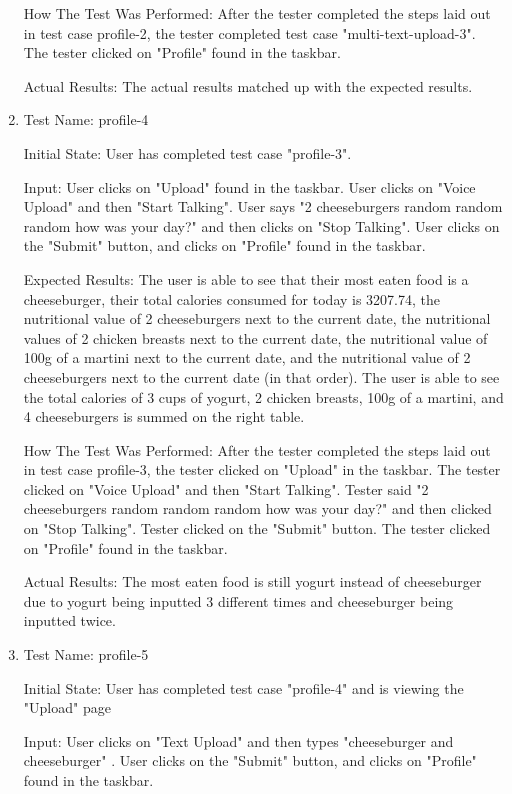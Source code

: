 \documentclass[12pt, titlepage]{article}
\begin{document}
\begin{enumerate}
		How The Test Was Performed: After the tester completed the steps laid out in test case profile-2, the tester completed test case "multi-text-upload-3". The tester clicked on "Profile" found in the taskbar.
		
		Actual Results: The actual results matched up with the expected results.
		
		\item{Test Name: profile-4}
		
		Initial State: User has completed test case "profile-3".
		
		Input: User clicks on "Upload" found in the taskbar. User clicks on "Voice Upload" and then "Start Talking". User says "2 cheeseburgers random random random how was your day?" and then clicks on "Stop Talking". User clicks on the "Submit" button, and clicks on "Profile" found in the taskbar.
		
		Expected Results: The user is able to see that their most eaten food is a cheeseburger, their total calories consumed for today is 3207.74, the nutritional value of 2 cheeseburgers next to the current date, the nutritional values of 2 chicken breasts next to the current date, the nutritional value of 100g of a martini next to the current date, and the nutritional value of 2 cheeseburgers next to the current date (in that order). The user is able to see the total calories of 3 cups of yogurt, 2 chicken breasts, 100g of a martini, and 4 cheeseburgers is summed on the right table.
		
		How The Test Was Performed: After the tester completed the steps laid out in test case profile-3, the tester clicked on "Upload" in the taskbar. The tester clicked on "Voice Upload" and then "Start Talking". Tester said "2 cheeseburgers random random random how was your day?" and then clicked on "Stop Talking". Tester clicked on the "Submit" button. The tester clicked on "Profile" found in the taskbar.
		
		Actual Results: The most eaten food is still yogurt instead of cheeseburger due to yogurt being inputted 3 different times and cheeseburger being inputted twice.
		
		\item{Test Name: profile-5}
		
		Initial State: User has completed test case "profile-4" and is viewing the "Upload" page
		
		Input: User clicks on "Text Upload" and then types "cheeseburger and cheeseburger" . User clicks on the "Submit" button, and clicks on "Profile" found in the taskbar.
		

\end{enumerate}
\end{document}
